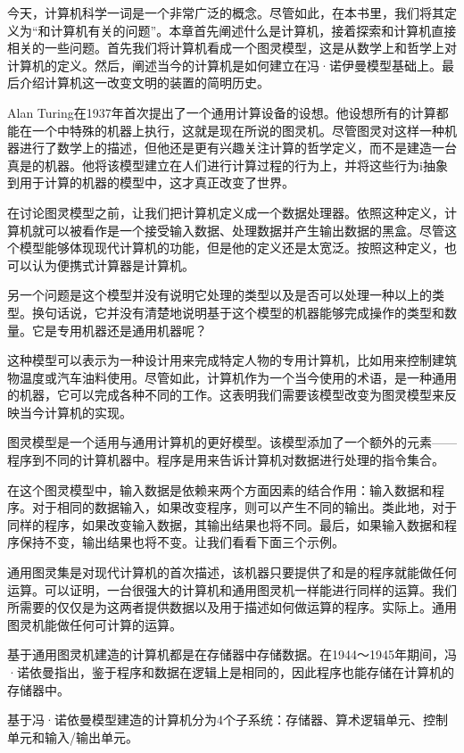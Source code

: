 
今天，计算机科学一词是一个非常广泛的概念。尽管如此，在本书里，我们将其定义为“和计算机有关的问题”。本章首先阐述什么是计算机，接着探索和计算机直接相关的一些问题。首先我们将计算机看成一个图灵模型，这是从数学上和哲学上对计算机的定义。然后，阐述当今的计算机是如何建立在冯·诺伊曼模型基础上。最后介绍计算机这一改变文明的装置的简明历史。


Alan Turing在1937年首次提出了一个通用计算设备的设想。他设想所有的计算都能在一个中特殊的机器上执行，这就是现在所说的图灵机。尽管图灵对这样一种机器进行了数学上的描述，但他还是更有兴趣关注计算的哲学定义，而不是建造一台真是的机器。他将该模型建立在人们进行计算过程的行为上，并将这些行为i抽象到用于计算的机器的模型中，这才真正改变了世界。


在讨论图灵模型之前，让我们把计算机定义成一个数据处理器。依照这种定义，计算机就可以被看作是一个接受输入数据、处理数据并产生输出数据的黑盒。尽管这个模型能够体现现代计算机的功能，但是他的定义还是太宽泛。按照这种定义，也可以认为便携式计算器是计算机。

另一个问题是这个模型并没有说明它处理的类型以及是否可以处理一种以上的类型。换句话说，它并没有清楚地说明基于这个模型的机器能够完成操作的类型和数量。它是专用机器还是通用机器呢？


这种模型可以表示为一种设计用来完成特定人物的专用计算机，比如用来控制建筑物温度或汽车油料使用。尽管如此，计算机作为一个当今使用的术语，是一种通用的机器，它可以完成各种不同的工作。这表明我们需要该模型改变为图灵模型来反映当今计算机的实现。

图灵模型是一个适用与通用计算机的更好模型。该模型添加了一个额外的元素——程序到不同的计算机器中。程序是用来告诉计算机对数据进行处理的指令集合。

在这个图灵模型中，输入数据是依赖来两个方面因素的结合作用：输入数据和程序。对于相同的数据输入，如果改变程序，则可以产生不同的输出。类此地，对于同样的程序，如果改变输入数据，其输出结果也将不同。最后，如果输入数据和程序保持不变，输出结果也将不变。让我们看看下面三个示例。

通用图灵集是对现代计算机的首次描述，该机器只要提供了和是的程序就能做任何运算。可以证明，一台很强大的计算机和通用图灵机一样能进行同样的运算。我们所需要的仅仅是为这两者提供数据以及用于描述如何做运算的程序。实际上。通用图灵机能做任何可计算的运算。

基于通用图灵机建造的计算机都是在存储器中存储数据。在1944～1945年期间，冯·诺依曼指出，鉴于程序和数据在逻辑上是相同的，因此程序也能存储在计算机的存储器中。

基于冯·诺依曼模型建造的计算机分为4个子系统：存储器、算术逻辑单元、控制单元和输入/输出单元。

